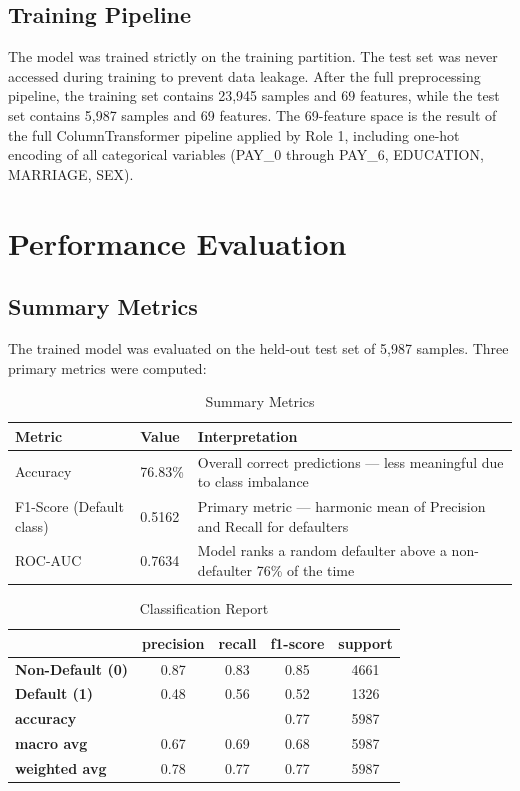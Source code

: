 \subsection{Training Pipeline}
The model was trained strictly on the training partition. The test set was never accessed during training to prevent data leakage. After the full preprocessing pipeline, the training set contains 23,945 samples and 69 features, while the test set contains 5,987 samples and 69 features. The 69-feature space is the result of the full ColumnTransformer pipeline applied by Role 1, including one-hot encoding of all categorical variables (PAY\_0 through PAY\_6, EDUCATION, MARRIAGE, SEX).

\section{Performance Evaluation}

\subsection{Summary Metrics}
The trained model was evaluated on the held-out test set of 5,987 samples. Three primary metrics were computed:

\begin{table}[h!]
\centering
\small
\setlength{\tabcolsep}{5pt}
\begin{tabularx}{\textwidth}{llX}
\toprule
\textbf{Metric} & \textbf{Value} & \textbf{Interpretation} \\
\midrule
Accuracy & 76.83\% & Overall correct predictions --- less meaningful due to class imbalance \\
F1-Score (Default class) & 0.5162 & Primary metric --- harmonic mean of Precision and Recall for defaulters \\
ROC-AUC & 0.7634 & Model ranks a random defaulter above a non-defaulter 76\% of the time \\
\bottomrule
\end{tabularx}
\caption{Summary Metrics}
\end{table}

\begin{table}[H]
\centering
\begin{tabular}{lcccc}
\toprule
 & \textbf{precision} & \textbf{recall} & \textbf{f1-score} & \textbf{support} \\
\midrule
\textbf{Non-Default (0)} & 0.87 & 0.83 & 0.85 & 4661 \\
\textbf{Default (1)} & 0.48 & 0.56 & 0.52 & 1326 \\
\midrule
\textbf{accuracy} &  &  & 0.77 & 5987 \\
\textbf{macro avg} & 0.67 & 0.69 & 0.68 & 5987 \\
\textbf{weighted avg} & 0.78 & 0.77 & 0.77 & 5987 \\
\bottomrule
\end{tabular}
\caption{Classification Report}
\label{tab:classification_report}
\end{table}

